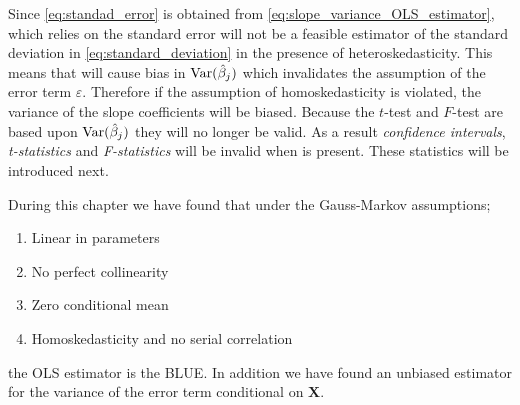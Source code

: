 Since \eqref{eq:standad_error} is obtained from \eqref{eq:slope_variance_OLS_estimator}, which relies on \homo the standard error will not be a feasible estimator of the standard deviation in \eqref{eq:standard_deviation} in the presence of heteroskedasticity. 
This means that \hetero will cause bias in $\operatorname{\text{Var}}(\hat{\beta}_j)$ which invalidates the assumption of the error term $\varepsilon$.
Therefore if the assumption of homoskedasticity is violated, the variance of the slope coefficients will be biased. 
Because the $t$-test and $F$-test are based upon $\operatorname{\text{Var}}(\hat{\beta}_j)$ they will no longer be valid. 
As a result \textit{confidence intervals}, \textit{t-statistics} and \textit{F-statistics} will be invalid when \hetero is present. 
These statistics will be introduced next.

During this chapter we have found that under the Gauss-Markov assumptions;
\begin{enumerate}
    \item Linear in parameters
    \item No perfect collinearity
    \item Zero conditional mean
    \item Homoskedasticity and no serial correlation
\end{enumerate}
 the OLS estimator is the BLUE. 
 In addition we have found an unbiased estimator for the variance of the error term conditional on $\textbf{X}$.